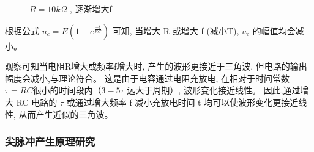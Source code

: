 \documentclass[UTF8]{ctexart}
\begin{document}
\begin{figure}[htbp]
    \centering
    \quad   
    \caption{$R=10k \Omega$ , 逐渐增大f}
    \label{fig.1}
\end{figure}

根据公式 $ u_{c}=E\left(1-e^{\frac{-t}{R C}}\right) $ 可知, 当增大  R  或增大  f  (减小T), $ u_{c} $ 的幅值均会减小。

观察可知当电阻R增大或频率f增大时, 产生的波形更接近于三角波, 但电路的输出幅度会减小,与理论符合。
这是由于电容通过电阻充放电, 在相对于时间常数  $\tau=R C  $很小的时间段内（$3-5\tau$ 远大于周期）, 波形变化接近线性。
因此,通过增大 RC 电路的  $\tau$  或通过增大频率  f  减小充放电时间  t  均可以使波形变化更接近线性, 从而产生近似的三角波。
\subsubsection{尖脉冲产生原理研究}
\end{document}
